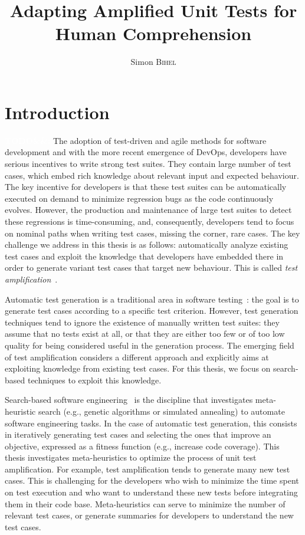 \documentclass[a4paper,11pt]{sdm_internship}
\title{Adapting Amplified Unit Tests for Human Comprehension}
\author{Simon \textsc{Bihel}}
\newcommand{\todo}[1]{\colorbox{Red!75}{\textcolor{white}{\textbf{TODO\ifx&#1&\else: #1\fi}}}}
\theoremstyle{definition}
\begin{document}
\maketitle

\section*{Introduction}%
\label{sec:intro}%
\todo{}
The adoption of test-driven and agile methods for software development and with the more recent emergence of DevOps, developers have serious incentives to write strong test suites.
They contain large number of test cases, which embed rich knowledge about relevant input and expected behaviour.
The key incentive for developers is that these test suites can be automatically executed on demand to minimize regression bugs as the code continuously evolves.
However, the production and maintenance of large test suites to detect these regressions is time-consuming, and, consequently, developers tend to focus on nominal paths when writing test cases, missing the corner, rare cases.
The key challenge we address in this thesis is as follows: automatically analyze existing test cases and exploit the knowledge that developers have embedded there in order to generate variant test cases that target new behaviour.
This is called \emph{test amplification}~\cite{danglot2017emerging}.

Automatic test generation is a traditional area in software testing~\cite{mcminn2011search}: the goal is to generate test cases according to a specific test criterion.
However, test generation techniques tend to ignore the existence of manually written test suites: they assume that no tests exist at all, or that they are either too few or of too low quality for being considered useful in the generation process.
The emerging field of test amplification considers a different approach and explicitly aims at exploiting knowledge from existing test cases.
For this thesis, we focus on search-based techniques to exploit this knowledge.

Search-based software engineering~\cite{harman2001search} is the discipline that investigates meta-heuristic search (e.g., genetic algorithms or simulated annealing) to automate software engineering tasks.
In the case of automatic test generation, this consists in iteratively generating test cases and selecting the ones that improve an objective, expressed as a fitness function (e.g., increase code coverage).
This thesis investigates meta-heuristics to optimize the process of unit test amplification.
For example, test amplification tends to generate many new test cases.
This is challenging for the developers who wish to minimize the time spent on test execution and who want to understand these new tests before integrating them in their code base.
Meta-heuristics can serve to minimize the number of relevant test cases, or generate summaries for developers to understand the new test cases.
\end{document}
